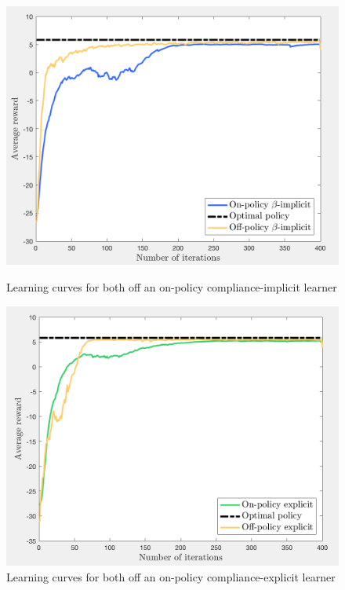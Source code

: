 \documentclass[a4paper]{report}
\begin{document}
{{{				\begin{figure}[h!]
					\begin{minipage}{0.5\linewidth}
						\includegraphics[width=\linewidth]{off_policy_implicit}
						\caption{Learning curves for both off an on-policy compliance-implicit learner}
						\label{fig::off_policy_implicit}
					\end{minipage}
					\begin{minipage}{0.5\linewidth}
						\includegraphics[width=\linewidth]{off_policy_explicit}
						\caption{Learning curves for both off an on-policy compliance-explicit learner}
						\label{fig::off_policy_explicit}
					\end{minipage}
				\end{figure}
				
}}}
\end{document}
